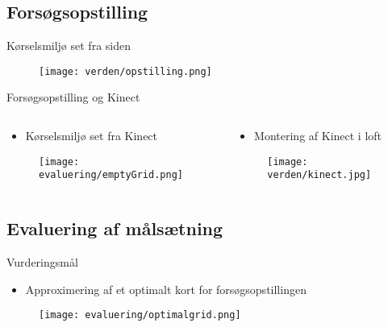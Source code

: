 \subsection{Forsøgsopstilling}
\begin{frame}[fragile]{Kørselsmiljø set fra siden}
	\begin{figure}
		\texttt{[image: verden/opstilling.png]}
	\end{figure}
\end{frame}

\begin{frame}[fragile]{Forsøgsopstilling og Kinect}
	\begin{columns}
		\begin{column}{0.5\textwidth}
			\begin{itemize}
				\item Kørselsmiljø set fra Kinect
			\end{itemize}
			\begin{figure}
				\texttt{[image: evaluering/emptyGrid.png]}
			\end{figure}
		\end{column}
		
		\begin{column}{0.5\textwidth}
				\begin{itemize}
					\item Montering af Kinect i loft
				\end{itemize}
			\begin{figure}
				\texttt{[image: verden/kinect.jpg]}
			\end{figure}
	\end{column}
\end{columns}
\end{frame}

\subsection{Evaluering af målsætning}
\begin{frame}[fragile]{Vurderingsmål}
	\begin{itemize}
		\item Approximering af et optimalt kort for forsøgsopstillingen
	\end{itemize}
	
	\begin{figure}
		\texttt{[image: evaluering/optimalgrid.png]}
	\end{figure}
\end{frame}

